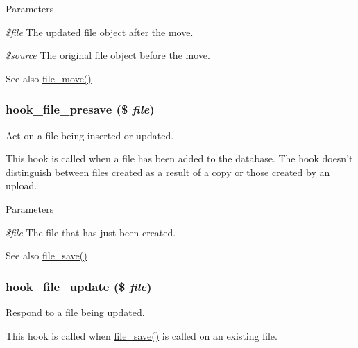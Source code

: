\begin{DoxyParams}{Parameters}
\item[{\em \$file}]The updated file object after the move. \item[{\em \$source}]The original file object before the move.\end{DoxyParams}
\begin{DoxySeeAlso}{See also}
\hyperlink{group__file_gad6f4eec44e0c32bf0cde6c602d5da38f}{file\_\-move()} 
\end{DoxySeeAlso}
\hypertarget{group__hooks_ga7350980f3f4679989f9c5aa2b7f0df05}{
\subsubsection[{hook\_\-file\_\-presave}]{\setlength{\rightskip}{0pt plus 5cm}hook\_\-file\_\-presave (\$ {\em file})}}
\label{group__hooks_ga7350980f3f4679989f9c5aa2b7f0df05}
Act on a file being inserted or updated.

This hook is called when a file has been added to the database. The hook doesn't distinguish between files created as a result of a copy or those created by an upload.


\begin{DoxyParams}{Parameters}
\item[{\em \$file}]The file that has just been created.\end{DoxyParams}
\begin{DoxySeeAlso}{See also}
\hyperlink{group__file_ga80327cb23d8d384b827b2637cd8cc4ba}{file\_\-save()} 
\end{DoxySeeAlso}
\hypertarget{group__hooks_ga604abda1f5df3f041f7ef748b9762475}{
\subsubsection[{hook\_\-file\_\-update}]{\setlength{\rightskip}{0pt plus 5cm}hook\_\-file\_\-update (\$ {\em file})}}
\label{group__hooks_ga604abda1f5df3f041f7ef748b9762475}
Respond to a file being updated.

This hook is called when \hyperlink{group__file_ga80327cb23d8d384b827b2637cd8cc4ba}{file\_\-save()} is called on an existing file.


